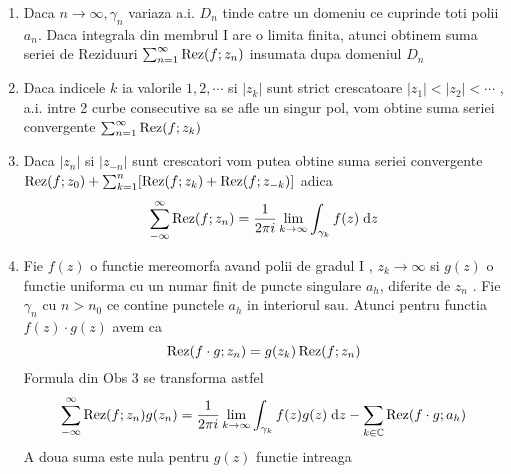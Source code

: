     \begin{observation}\leavevmode
        \begin{enumerate}
            \item Daca $n \to \infty, \gamma_n$ variaza a.i. $D_n$ tinde catre un domeniu
                ce cuprinde toti polii $a_n$. Daca integrala din membrul $\mathrm{I}$ are o limita finita,
                atunci obtinem suma seriei de Reziduuri $ \sum_{n=1}^{\infty}\operatorname{Rez}(f;z_n)$ insumata
                dupa domeniul $D_n$
            \item Daca indicele $k$ ia valorile $1,2,\cdots $ si $|z_k|$ sunt strict crescatoare
                $|z_1|<|z_2|< \cdots$ , a.i. intre 2 curbe consecutive sa se afle un singur pol,
                vom obtine suma seriei convergente $\sum_{n=1}^{\infty}\operatorname{Rez}(f;z_k)$
            \item Daca  $|z_n|$ si  $|z_{-n}|$ sunt crescatori vom putea obtine suma seriei
                convergente  $\operatorname{Rez}(f;z_0) + \sum_{k=1}^{n}[\operatorname{Rez}(f;z_k)+ \operatorname{Rez}(f;z_{-k})]$ adica
                \[
                    \sum_{-\infty}^{\infty} \operatorname{Rez}(f;z_n)
                        = \frac{1}{2 \pi i} \lim_{k\to \infty} \int_{\gamma_k} f(z) \; \mathrm{d} z
                \]
            \item Fie $f(z)$ o functie mereomorfa avand polii de gradul $\mathrm{I}$ , $z_k \to \infty$ si
                $g(z)$ o functie uniforma cu un numar finit de puncte singulare $a_h$, diferite de
                $z_n$ . Fie $\gamma_n$ cu $n>n_0$ ce contine punctele $a_h$ in interiorul sau.
                Atunci pentru functia $f(z)\cdot g(z)$ avem ca
                \[
                    \operatorname{Rez}(f\cdot g;z_n)=g(z_k) \operatorname{Rez}(f;z_n)
                \]
                Formula din Obs 3 se transforma astfel
                \[
                    \sum_{-\infty}^{\infty} \operatorname{Rez}(f;z_n) g(z_n)
                        = \frac{1}{2 \pi i} \lim_{k\to \infty} \int_{\gamma_k} f(z)g(z) \; \mathrm{d} z
                        - \sum_{k\in\mathbb{C}} \operatorname{Rez}(f\cdot g; a_h)
                \]
                A doua suma este nula pentru $g(z)$ functie intreaga
        \end{enumerate}
    \end{observation}

